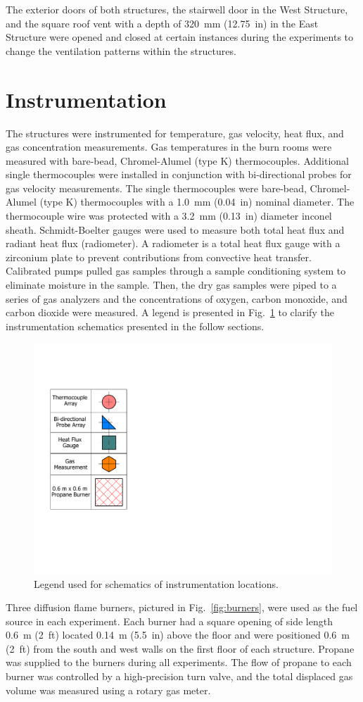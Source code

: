 \documentclass[12pt,oneside]{book}
\begin{document}
The exterior doors of both structures, the stairwell door in the West Structure, and the square roof vent with a depth of 320~mm (12.75~in) in the East Structure were opened and closed at certain instances during the experiments to change the ventilation patterns within the structures.

\section{Instrumentation}
\label{sec:Instrumentation}
The structures were instrumented for temperature, gas velocity, heat flux, and gas concentration measurements. Gas temperatures in the burn rooms were measured with bare-bead, Chromel-Alumel (type K) thermocouples. Additional single thermocouples were installed in conjunction with bi-directional probes for gas velocity measurements. The single thermocouples were bare-bead, Chromel-Alumel (type K) thermocouples with a 1.0~mm (0.04~in) nominal diameter. The thermocouple wire was protected with a 3.2~mm (0.13~in) diameter inconel sheath. Schmidt-Boelter gauges were used to measure both total heat flux and radiant heat flux (radiometer). A radiometer is a total heat flux gauge with a zirconium plate to prevent contributions from convective heat transfer. Calibrated pumps pulled gas samples through a sample conditioning system to eliminate moisture in the sample. Then, the dry gas samples were piped to a series of gas analyzers and the concentrations of oxygen, carbon monoxide, and carbon dioxide were measured. A legend is presented in Fig.~\ref{fig:Instrumentation_Legend} to clarify the instrumentation schematics presented in the follow sections.

\begin{figure}[!ht]
	\includegraphics[width=0.25\columnwidth]{../Figures/Floor_Plans/Instrumentation_Legend}
	\caption[Instrumentation legend.]{Legend used for schematics of instrumentation locations.}
	\label{fig:Instrumentation_Legend}
\end{figure}

Three diffusion flame burners, pictured in Fig.~\ref{fig:burners}, were used as the fuel source in each experiment. Each burner had a square opening of side length 0.6~m (2~ft) located 0.14~m (5.5~in) above the floor and were positioned 0.6~m (2~ft) from the south and west walls on the first floor of each structure. Propane was supplied to the burners during all experiments. The flow of propane to each burner was controlled by a high-precision turn valve, and the total displaced gas volume was measured using a rotary gas meter.
\end{document}
